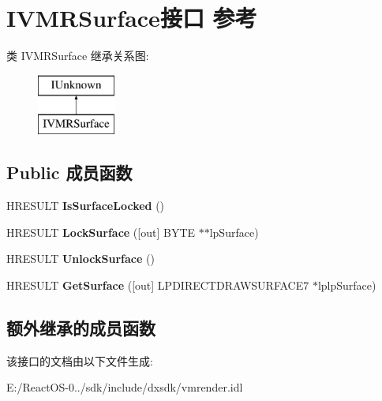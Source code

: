 \hypertarget{interface_i_v_m_r_surface}{}\section{I\+V\+M\+R\+Surface接口 参考}
\label{interface_i_v_m_r_surface}
类 I\+V\+M\+R\+Surface 继承关系图\+:\begin{figure}[H]
\begin{center}
\leavevmode
\includegraphics[height=2.000000cm]{interface_i_v_m_r_surface}
\end{center}
\end{figure}
\subsection*{Public 成员函数}
\begin{DoxyCompactItemize}
\item 
\mbox{\label{interface_i_v_m_r_surface_af769d6922bda8c46e812a55daf27e060}} 
H\+R\+E\+S\+U\+LT {\bfseries Is\+Surface\+Locked} ()
\item 
\mbox{\label{interface_i_v_m_r_surface_a84bcc46d19a16c258d70e9873e5fd9b2}} 
H\+R\+E\+S\+U\+LT {\bfseries Lock\+Surface} (\mbox{[}out\mbox{]} B\+Y\+TE $\ast$$\ast$lp\+Surface)
\item 
\mbox{\label{interface_i_v_m_r_surface_af780f232aa3e7d1e08e5b2f5acd01d68}} 
H\+R\+E\+S\+U\+LT {\bfseries Unlock\+Surface} ()
\item 
\mbox{\label{interface_i_v_m_r_surface_a33eeae3eb72a361af55139f272ec65da}} 
H\+R\+E\+S\+U\+LT {\bfseries Get\+Surface} (\mbox{[}out\mbox{]} L\+P\+D\+I\+R\+E\+C\+T\+D\+R\+A\+W\+S\+U\+R\+F\+A\+C\+E7 $\ast$lplp\+Surface)
\end{DoxyCompactItemize}
\subsection*{额外继承的成员函数}


该接口的文档由以下文件生成\+:\begin{DoxyCompactItemize}
\item 
E\+:/\+React\+O\+S-\/0../sdk/include/dxsdk/vmrender.\+idl\end{DoxyCompactItemize}

